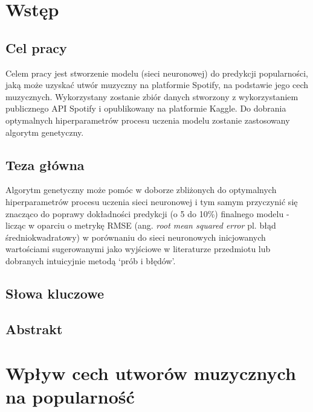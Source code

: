 \documentclass[a4paper,11pt]{article}
\begin{document}
    \newpage

    \maketitle

    \tableofcontents


    \section{Wstęp}

    \subsection{Cel pracy}

    Celem pracy jest stworzenie modelu (sieci neuronowej) do predykcji popularności, jaką może uzyskać utwór muzyczny na platformie Spotify, na podstawie jego cech muzycznych. Wykorzystany zostanie zbiór danych stworzony z wykorzystaniem publicznego API Spotify i opublikowany na platformie Kaggle. Do dobrania optymalnych hiperparametrów procesu uczenia modelu zostanie zastosowany algorytm genetyczny.

    \subsection{Teza główna}

    Algorytm genetyczny może pomóc w doborze zbliżonych do optymalnych hiperparametrów procesu uczenia sieci neuronowej i tym samym przyczynić się znacząco do poprawy dokładności predykcji (o 5 do 10\%) finalnego modelu - licząc w oparciu o metrykę RMSE (ang. \textit{root mean squared error} pl. błąd średniokwadratowy) w porównaniu do sieci neuronowych inicjowanych wartościami sugerowanymi jako wyjściowe w literaturze przedmiotu lub dobranych intuicyjnie metodą `prób i błędów'.

    \subsection{Słowa kluczowe} %

    \subsection{Abstrakt} %


    \section{Wpływ cech utworów muzycznych na popularność}
\end{document}
